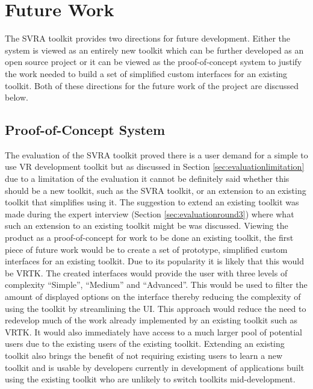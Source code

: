 \documentclass{l4proj}
\begin{document}
\section{Future Work}
\label{sec:conclusionfuturework}
The SVRA toolkit provides two directions for future development. Either the system is viewed as an entirely new toolkit which can be further developed as an open source project or it can be viewed as the proof-of-concept system to justify the work needed to build a set of simplified custom interfaces for an existing toolkit. Both of these directions for the future work of the project are discussed below.

\subsection{Proof-of-Concept System}
\label{sec:conclusionproofofconcept}
The evaluation of the SVRA toolkit proved there is a user demand for a simple to use VR development toolkit but as discussed in Section \ref{sec:evaluationlimitation} due to a limitation of the evaluation it cannot be definitely said whether this should be a new toolkit, such as the SVRA toolkit, or an extension to an existing toolkit that simplifies using it. The suggestion to extend an existing toolkit was made during the expert interview (Section \ref{sec:evaluationround3}) where what such an extension to an existing toolkit might be was discussed. Viewing the product as a proof-of-concept for work to be done an existing toolkit, the first piece of future work would be to create a set of prototype, simplified custom interfaces for an existing toolkit. Due to its popularity it is likely that this would be VRTK. The created interfaces would provide the user with three levels of complexity ``Simple'', ``Medium'' and ``Advanced''. This would be used to filter the amount of displayed options on the interface thereby reducing the complexity of using the toolkit by streamlining the UI. This approach would reduce the need to redevelop much of the work already implemented by an existing toolkit such as VRTK. It would also immediately have access to a much larger pool of potential users due to the existing users of the existing toolkit. Extending an existing toolkit also brings the benefit of not requiring existing users to learn a new toolkit and is usable by developers currently in development of applications built using the existing toolkit who are unlikely to switch toolkits mid-development.  
\end{document}
